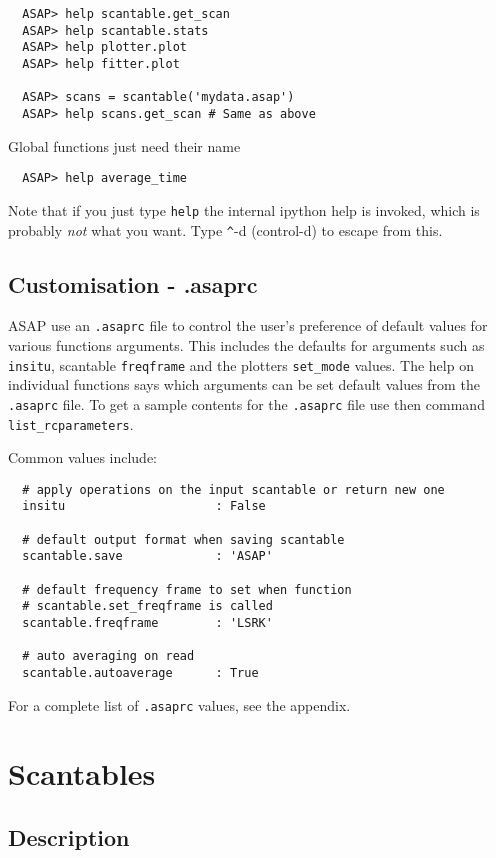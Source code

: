 \documentclass[11pt]{article}
\newcommand{\cmd}[1]{{\tt #1}}
\begin{document}
\begin{verbatim}
  ASAP> help scantable.get_scan
  ASAP> help scantable.stats
  ASAP> help plotter.plot
  ASAP> help fitter.plot

  ASAP> scans = scantable('mydata.asap')
  ASAP> help scans.get_scan # Same as above
\end{verbatim}

Global functions just need their name

\begin{verbatim}
  ASAP> help average_time
\end{verbatim}

Note that if you just type \cmd{help} the internal ipython help is
invoked, which is probably {\em not} what you want. Type \verb+^+-d
(control-d) to escape from this.

\subsection{Customisation - .asaprc}

ASAP use an \cmd{.asaprc} file to control the user's
preference of default values for various functions arguments. This
includes the defaults for arguments such as \cmd{insitu}, scantable
\cmd{freqframe} and the plotters \cmd{set\_mode} values. The help on
individual functions says which arguments can be set default values
from the \cmd{.asaprc} file. To get a sample contents for the
\cmd{.asaprc} file use then command \cmd{list\_rcparameters}.

Common values include:
\begin{verbatim}
  # apply operations on the input scantable or return new one
  insitu                     : False

  # default output format when saving scantable
  scantable.save             : 'ASAP'

  # default frequency frame to set when function
  # scantable.set_freqframe is called
  scantable.freqframe        : 'LSRK'

  # auto averaging on read
  scantable.autoaverage      : True
\end{verbatim}

For a complete list of \cmd{.asaprc} values, see the appendix.

\section{Scantables}
\subsection {Description}
\end{document}
